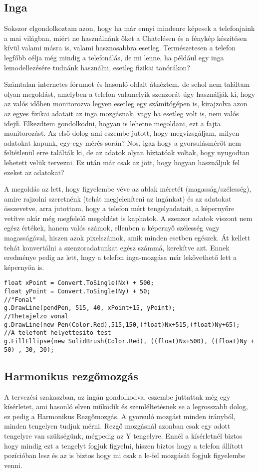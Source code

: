 \documentclass{thesis-ekf}
\theoremstyle{definition}
\theoremstyle{remark}
\begin{document}
\subsection{Inga}
Sokszor elgondolkoztam azon, hogy ha már ennyi mindenre képesek a telefonjaink a mai világban, miért ne használnánk őket a Chatelésen és a fénykép készítésen kívül valami másra is, valami hasznosabbra esetleg. Természetesen a telefon legfőbb célja még mindig a telefonálás, de mi lenne, ha például egy inga lemodellezésére tudnánk használni, esetleg fizikai tanórákon?
\par Számtalan internetes fórumot és hasonló oldalt átnéztem, de sehol nem találtam olyan megoldást, amelyben a telefon valamelyik szenzorát úgy használják ki, hogy az valós időben monitorozva legyen esetleg egy számítógépen is, kirajzolva azon az egyes fizikai adatait az inga mozgásnak, vagy ha esetleg volt is, nem valós idejű. Elkezdtem gondolkodni, hogyan is lehetne megoldani, ezt a fajta monitorozást. Az első dolog ami eszembe jutott, hogy megvizsgáljam, milyen adatokat kapunk, egy-egy mérés során? Nos, igaz hogy a gyorsulásmérőt nem feltétlenül erre találták ki, de az adatok olyan bíztatóak voltak, hogy nyugodtan lehetett velük tervezni. Ez után már csak az jött, hogy hogyan használjuk fel ezeket az adatokat?
\par A megoldás az lett, hogy figyelembe véve az ablak méretét (magasság/szélesség), amire rajzolni szeretnénk (tehát megjeleníteni az ingánkat) és az adatokat összevetve, arra jutottam, hogy a telefon mért tengelyadatait, a képernyőre vetítve akár még megfelelő megoldást is kaphatok. A szenzor adatok viszont nem egész értékek, hanem valós számok, ellenben a képernyő szélesség vagy magasságával, hiszen azok pixelszámok, amik minden esetben egészek. Át kellett tehát konvertálni a szenzoradatunkat egész számmá, kerekítve azt. Ennek eredménye pedig az lett, hogy a telefon inga-mozgása már lekövethető lett a képernyőn is. 
 \begin{lstlisting}
float xPoint = Convert.ToSingle(Nx) + 500;
float yPoint = Convert.ToSingle(Ny) + 50;
//"Fonal"
g.DrawLine(pendPen, 515, 40, xPoint+15, yPoint);
//Thetajelzo vonal
g.DrawLine(new Pen(Color.Red),515,150,(float)Nx+515,(float)Ny+65);
//A telefont helyettesito test
g.FillEllipse(new SolidBrush(Color.Red), ((float)Nx+500), ((float)Ny + 50) , 30, 30);
 \end{lstlisting}
\subsection{Harmonikus rezgőmozgás}
\par A tervezési szakaszban, az ingán gondolkodva, eszembe juttattak még egy kísérletet, ami hasonló elven működik és szemléltetésnek se a legrosszabb dolog, ez pedig a Harmonikus Rezgőmozgás. A gyorsuló mozgást minden irányból, minden tengelyen tudjuk mérni. Rezgő mozgásnál azonban csak egy adott tengelyre van szükségünk, mégpedig az Y tengelyre. Ennél a kísérletnél biztos hogy mindig ezt a tengelyt fogjuk figyelni, hiszen biztos hogy a telefon állított pozícióban lesz és az is biztos hogy mi csak a le-fel mozgását fogjuk figyelembe venni.
\end{document}
